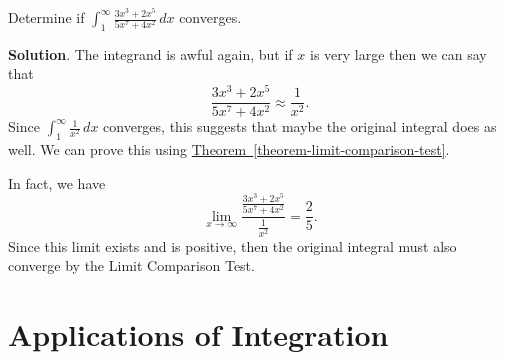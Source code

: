 \documentclass[10pt,]{book}
\theoremstyle{ptxplainnotitle}
\theoremstyle{ptxplaintitle}
\theoremstyle{ptxplainnotitle}
\theoremstyle{ptxplaintitle}
\theoremstyle{ptxplainnotitle}
\theoremstyle{ptxplaintitle}
\theoremstyle{ptxdefinitionnotitle}
\theoremstyle{ptxdefinitiontitle}
\theoremstyle{ptxdefinitionnotitle}
\theoremstyle{ptxdefinitiontitle}
\theoremstyle{ptxdefinitionnotitle}
\theoremstyle{ptxdefinitiontitle}
\theoremstyle{ptxdefinitionnotitle}
\theoremstyle{ptxdefinitiontitle}
\theoremstyle{ptxdefinitionnotitle}
\theoremstyle{ptxdefinitiontitle}
\numberwithin{equation}{section}
\begin{document}
\begin{example}\label{example-137}
\hypertarget{p-610}{}%
Determine if \(\displaystyle\int_{1}^{\infty}\frac{3x^{3} + 2x^{5}}{5x^{7} + 4x^{2}}\,dx\) converges.%
\par\smallskip%
\noindent\textbf{Solution}.\hypertarget{solution-133}{}\quad%
\hypertarget{p-611}{}%
The integrand is awful again, but if \(x\) is very large then we can say that%
\begin{equation*}
\frac{3x^{3} + 2x^{5}}{5x^{7} + 4x^{2}} \approx \frac{1}{x^{2}}.
\end{equation*}
Since \(\int_{1}^{\infty}\frac{1}{x^{2}}\,dx\) converges, this suggests that maybe the original integral does as well. We can prove this using \hyperref[theorem-limit-comparison-test]{Theorem~\ref{theorem-limit-comparison-test}}.%
\par
\hypertarget{p-612}{}%
In fact, we have%
\begin{equation*}
\lim_{x\to\infty}\frac{\frac{3x^{3} + 2x^{5}}{5x^{7} + 4x^{2}}}{\frac{1}{x^{2}}} = \frac{2}{5}.
\end{equation*}
Since this limit exists and is positive, then the original integral must also converge by the Limit Comparison Test.%
\end{example}
\typeout{************************************************}
\typeout{************************************************}
\chapter[{Applications of Integration}]{Applications of Integration}\label{applications-of-integration}
\typeout{************************************************}
\typeout{************************************************}
\end{document}
